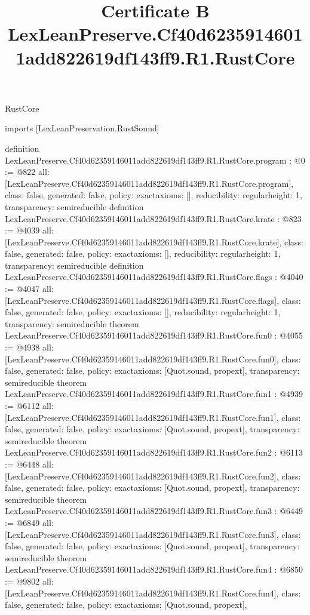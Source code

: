 \begin{lexlean}{RustCore}
\title{Certificate B LexLeanPreserve.Cf40d62359146011add822619df143ff9.R1.RustCore}
\begin{coremodule}
imports [LexLeanPreservation.RustSound]

definition LexLeanPreserve.Cf40d62359146011add822619df143ff9.R1.RustCore.program : @0 := @822 {
  all: [LexLeanPreserve.Cf40d62359146011add822619df143ff9.R1.RustCore.program],
  class: false,
  generated: false,
  policy: exact{axioms: []},
  reducibility: regular{height: 1},
  transparency: semireducible
}
definition LexLeanPreserve.Cf40d62359146011add822619df143ff9.R1.RustCore.krate : @823 := @4039 {
  all: [LexLeanPreserve.Cf40d62359146011add822619df143ff9.R1.RustCore.krate],
  class: false,
  generated: false,
  policy: exact{axioms: []},
  reducibility: regular{height: 1},
  transparency: semireducible
}
definition LexLeanPreserve.Cf40d62359146011add822619df143ff9.R1.RustCore.flags : @4040 := @4047 {
  all: [LexLeanPreserve.Cf40d62359146011add822619df143ff9.R1.RustCore.flags],
  class: false,
  generated: false,
  policy: exact{axioms: []},
  reducibility: regular{height: 1},
  transparency: semireducible
}
theorem LexLeanPreserve.Cf40d62359146011add822619df143ff9.R1.RustCore.fun0 : @4055 := @4938 {
  all: [LexLeanPreserve.Cf40d62359146011add822619df143ff9.R1.RustCore.fun0],
  class: false,
  generated: false,
  policy: exact{axioms: [Quot.sound, propext]},
  transparency: semireducible
}
theorem LexLeanPreserve.Cf40d62359146011add822619df143ff9.R1.RustCore.fun1 : @4939 := @6112 {
  all: [LexLeanPreserve.Cf40d62359146011add822619df143ff9.R1.RustCore.fun1],
  class: false,
  generated: false,
  policy: exact{axioms: [Quot.sound, propext]},
  transparency: semireducible
}
theorem LexLeanPreserve.Cf40d62359146011add822619df143ff9.R1.RustCore.fun2 : @6113 := @6448 {
  all: [LexLeanPreserve.Cf40d62359146011add822619df143ff9.R1.RustCore.fun2],
  class: false,
  generated: false,
  policy: exact{axioms: [Quot.sound, propext]},
  transparency: semireducible
}
theorem LexLeanPreserve.Cf40d62359146011add822619df143ff9.R1.RustCore.fun3 : @6449 := @6849 {
  all: [LexLeanPreserve.Cf40d62359146011add822619df143ff9.R1.RustCore.fun3],
  class: false,
  generated: false,
  policy: exact{axioms: [Quot.sound, propext]},
  transparency: semireducible
}
theorem LexLeanPreserve.Cf40d62359146011add822619df143ff9.R1.RustCore.fun4 : @6850 := @9802 {
  all: [LexLeanPreserve.Cf40d62359146011add822619df143ff9.R1.RustCore.fun4],
  class: false,
  generated: false,
  policy: exact{axioms: [Quot.sound, propext]},
}
\end{coremodule}
\end{lexlean}

